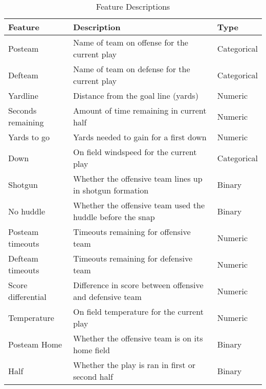\documentclass[11pt]{article}
\begin{document}
        

        
            \begin{table*}[ht]
            \caption{Feature Descriptions} \label{tab:title} 
            \centering
            \begin{tabular}{|| m{4cm} | m{10cm}| m{2cm} ||} 
                \hline
                \textbf{Feature} & \textbf{Description} & \textbf{Type}  \\
                \hline\hline
                Posteam  & Name of team on offense for the current play & Categorical \\
                \hline 
                Defteam & Name of team on defense for the current play & Categorical \\ 
                \hline
                Yardline  & Distance from the goal line (yards) & Numeric \\
                \hline 
                Seconds remaining & Amount of time remaining in current half & Numeric \\
                \hline
                Yards to go & Yards needed to gain for a first down & Numeric \\
                \hline 
                Down & On field windspeed for the current play & Categorical \\
                \hline 
                Shotgun & Whether the offensive team lines up in shotgun formation & Binary \\
                \hline
                No huddle & Whether the offensive team used the huddle before the snap & Binary \\
                \hline 
                Posteam timeouts & Timeouts remaining for offensive team & Numeric \\
                \hline
                Defteam timeouts & Timeouts remaining for defensive team & Numeric \\
                \hline 
                Score differential & Difference in score between offensive and defensive team & Numeric \\
                \hline
                Temperature & On field temperature for the current play & Numeric \\
                \hline 
                Posteam Home & Whether the offensive team is on its home field & Binary \\
                \hline 
                Half & Whether the play is ran in first or second half & Binary \\
                \hline 

\end{tabular}
\end{table*}
\end{document}
